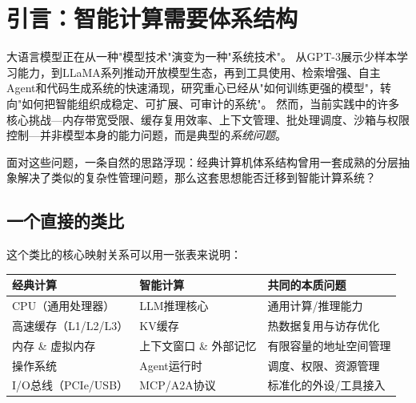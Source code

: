 \section{引言：智能计算需要体系结构}
\label{sec:intro}

大语言模型正在从一种"模型技术"演变为一种"系统技术"。
从GPT-3展示少样本学习能力\cite{brown2020gpt3}，到LLaMA系列推动开放模型生态\cite{llama2023}，再到工具使用\cite{schick2023toolformer}、检索增强\cite{lewis2020rag}、自主Agent\cite{yao2023react}和代码生成系统\cite{openhands_paper_2025,sweagent2024}的快速涌现，研究重心已经从"如何训练更强的模型"，转向"如何把智能组织成稳定、可扩展、可审计的系统"。
然而，当前实践中的许多核心挑战---内存带宽受限\cite{gholami2024memorywall}、缓存复用效率\cite{kwon2023pagedattention}、上下文管理\cite{memgpt2023}、批处理调度\cite{orca2022}、沙箱与权限控制\cite{ironclaw2025}---并非模型本身的能力问题，而是典型的\emph{系统问题}。

面对这些问题，一条自然的思路浮现：经典计算机体系结构曾用一套成熟的分层抽象解决了类似的复杂性管理问题，那么这套思想能否迁移到智能计算系统？

\subsection{一个直接的类比}

这个类比的核心映射关系可以用一张表来说明：

\begin{center}
\begin{tabular}{lll}
\hline
\textbf{经典计算} & \textbf{智能计算} & \textbf{共同的本质问题} \\
\hline
CPU（通用处理器） & LLM推理核心 & 通用计算/推理能力 \\
高速缓存（L1/L2/L3） & KV缓存 & 热数据复用与访存优化 \\
内存 \& 虚拟内存 & 上下文窗口 \& 外部记忆 & 有限容量的地址空间管理 \\
操作系统 & Agent运行时 & 调度、权限、资源管理 \\
I/O总线（PCIe/USB） & MCP/A2A协议 & 标准化的外设/工具接入 \\
\hline
\end{tabular}
\end{center}

